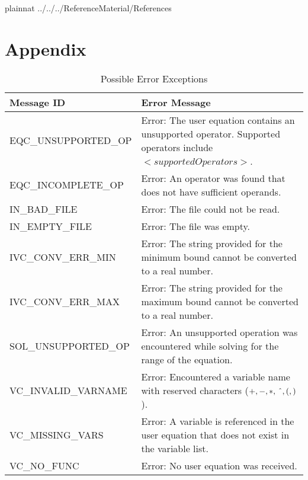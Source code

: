 \documentclass[12pt, titlepage]{article}
\begin{document}
\newpage

 {plainnat}
 {../../../ReferenceMaterial/References}

\newpage

\section{Appendix} \label{Appendix}

\renewcommand{\arraystretch}{1.2}

\begin{longtable}{l p{9.5cm}}
	\caption{Possible Error Exceptions} \\
	\toprule
	\textbf{Message ID} & \textbf{Error Message} \\
	\midrule
	EQC\_UNSUPPORTED\_OP & Error: The user equation contains an unsupported 
	operator. Supported operators include $<supportedOperators>$.\\
	EQC\_INCOMPLETE\_OP & Error: An operator was found that does not have 
	sufficient operands. \\
	IN\_BAD\_FILE & Error: The file could not be read. \\
	IN\_EMPTY\_FILE & Error: The file was empty. \\
	IVC\_CONV\_ERR\_MIN & Error: The string provided for the minimum bound 
	cannot be converted to a real number. \\
	IVC\_CONV\_ERR\_MAX & Error: The string provided for the maximum bound 
	cannot be converted to a real number.\\
	SOL\_UNSUPPORTED\_OP & Error: An unsupported operation was encountered 
	while solving for the range of the equation.\\
	VC\_INVALID\_VARNAME & Error: Encountered a variable name with reserved 
	characters ($+, - , *, \, \string^, (, )$). \\
	VC\_MISSING\_VARS & Error: A variable is referenced in the user equation 
	that does not exist in the variable list. \\
	VC\_NO\_FUNC & Error: No user equation was received. \\
	\bottomrule
\end{longtable}
\end{document}
